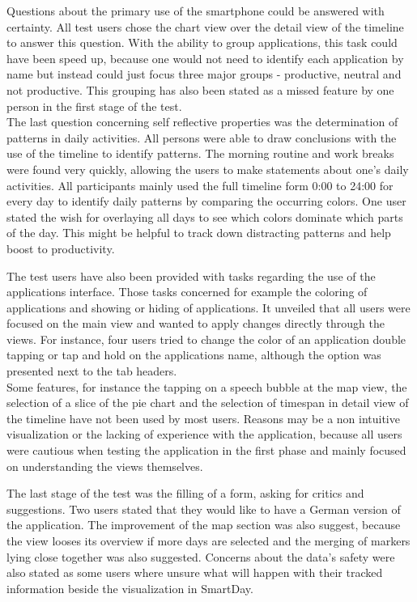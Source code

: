 Questions  about the primary use of the smartphone could be answered with certainty. All test users chose the chart view over the detail view of the timeline to answer this question. With the ability to group applications, this task could have been speed up, because one would not need to identify each application by name but instead could just focus three major groups - productive, neutral and not productive. This grouping has also been stated as a missed feature by one person in the first stage of the test.\\
The last question concerning self reflective properties was the determination of patterns in daily activities. All persons were able to draw conclusions with the use of the timeline to identify patterns. The morning routine and work breaks were found very quickly, allowing the users to make statements about one's daily activities. All participants mainly used the full timeline form 0:00 to 24:00 for every day to identify daily patterns by comparing the occurring colors. One user stated the wish for overlaying all days to see which colors dominate which parts of the day. This might be helpful to track down distracting patterns and help boost to productivity.

The  test users have also been provided with tasks regarding the use of the applications interface. Those tasks concerned for example the coloring of applications and showing or hiding of applications. It unveiled that all users were focused on the main view and wanted to apply changes directly through the views. For instance, four users tried to change the color of an application double tapping or tap and hold on the applications name, although the option was presented next to the tab headers.\\
Some features, for instance the tapping on a speech bubble at the map view, the selection of a slice of the pie chart and the selection of timespan in detail view of the timeline have not been used by most users. Reasons may be a non intuitive visualization or the lacking of experience with the application, because all users were cautious when testing the application in the first phase and mainly focused on understanding the views themselves.

The  last stage of the test was the filling of a form, asking for critics and suggestions. Two users stated that they would like to have a German version of the application. The improvement of the map section was also suggest, because the view looses its overview if more days are selected and the merging of markers lying close together was also suggested. Concerns about the data's safety were also stated as some users where unsure what will happen with their tracked information beside the visualization in SmartDay.

